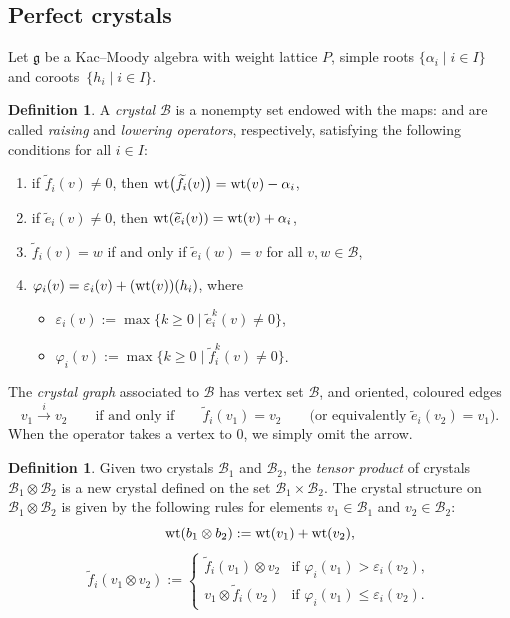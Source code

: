 \documentclass[10pt,a4paper]{amsart}
\numberwithin{equation}{section}
\theoremstyle{definition}
\newtheorem{Definition}[Theorem]{Definition}
\begin{document}
\subsection{Perfect crystals}
Let $\mathfrak{g}$ be a Kac--Moody algebra with weight lattice $P$, simple roots $\{\alpha_i\mid i\in I\}$ and coroots~${\{h_i \mid i\in I\}}$.
\begin{Definition}%
A \emph{crystal} $ \mathcal{B} $ is a nonempty set endowed with the maps:  and  are called \emph{raising} and \emph{lowering operators}, respectively, satisfying the following conditions for all $ i\in I $:
\begin{enumerate}[label=(\roman*)]\itemsep=0pt
 \item if $ \tilde{f}_i(v) \neq 0 $, then $ {\rm wt}\bigl(\widetilde{f}_i(v)\bigr) = {\rm wt}(v) - \alpha_i $,
 \item if $ \tilde{e}_i(v) \neq 0 $, then $ {\rm wt} (\widetilde{e}_i(v) ) = {\rm wt}(v) + \alpha_i $,
 \item $\tilde{f}_i(v)=w$ if and only if $\tilde{e}_i(w)=v$ for all $v,w\in \mathcal{B}$,
 \item $ \varphi_i(v) = \varepsilon_i(v) + ({\rm wt}(v) ) (h_i )$, where
 \begin{itemize}\itemsep=0pt
 \item $ \varepsilon_i(v) := \max \bigl\{ k \geq 0 \mid \tilde{e}_i^k(v) \neq 0 \bigr\} $,
 \item $ \varphi_i(v) := \max \bigl\{ k \geq 0 \mid \tilde{f}_i^k(v) \neq 0 \bigr\} $.
 \end{itemize}
\end{enumerate}
\end{Definition}

The \emph{crystal graph} associated to $\mathcal{B}$ has vertex set $\mathcal{B}$, and oriented, coloured edges
\[
v_1 \overset{i}{\longrightarrow} v_2 \qquad \text{if and only if} \qquad \tilde{f}_i(v_1) = v_2 \qquad \text{(or equivalently } \tilde{e}_i(v_2) = v_1).
\]
When the operator  takes a vertex to $0$, we simply omit the arrow.

\begin{Definition}\label{def:crystaltensor}
Given two crystals $ \mathcal{B}_1 $ and $ \mathcal{B}_2 $, the \emph{tensor product} of crystals $ \mathcal{B}_1 \otimes \mathcal{B}_2 $ is a new crystal defined on the set $ \mathcal{B}_1 \times \mathcal{B}_2 $. The crystal structure on $ \mathcal{B}_1 \otimes \mathcal{B}_2 $ is given by the following rules for elements $ v_1 \in \mathcal{B}_1 $ and $ v_2 \in \mathcal{B}_2 $:
\[
{\rm wt}(b_1 \otimes b_2) := {\rm wt}(v_1) + {\rm wt}(v_2),
\]
\[
\tilde{f}_i(v_1 \otimes v_2) :=
\begin{cases}
\tilde{f}_i(v_1) \otimes v_2 & \text{if } \varphi_i(v_1) > \varepsilon_i(v_2), \\
v_1 \otimes \tilde{f}_i(v_2) & \text{if } \varphi_i(v_1) \leq \varepsilon_i(v_2).
\end{cases}
\]
\end{Definition}
\end{document}
